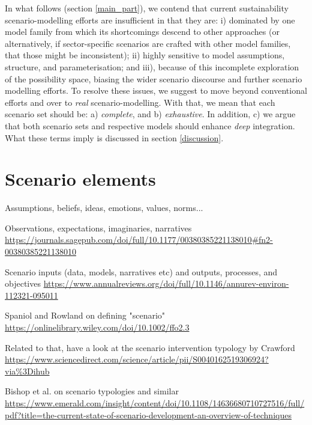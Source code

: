 \documentclass{article}
\begin{document}
\begin{refsection}
In what follows (section \ref{main_part}), we contend that current sustainability scenario-modelling efforts are insufficient in that they are: i) dominated by one model family from which its shortcomings descend to other approaches (or alternatively, if sector-specific scenarios are crafted with other model families, that those might be inconsistent); ii) highly sensitive to model assumptions, structure, and parameterisation; and iii), because of this incomplete exploration of the possibility space, biasing the wider scenario discourse and further scenario modelling efforts. To resolve these issues, we suggest to move beyond conventional efforts and over to \textit{real} scenario-modelling. With that, we mean that each scenario set should be: a) \textit{complete}, and b) \textit{exhaustive}. In addition, c) we argue that both scenario sets and respective models should enhance \textit{deep} integration. What these terms imply is discussed in section \ref{discussion}.

\section{Scenario elements}
Assumptions, beliefs, ideas, emotions, values, norms...

Observations, expectations, imaginaries, narratives \url{https://journals.sagepub.com/doi/full/10.1177/00380385221138010#fn2-00380385221138010}

Scenario inputs (data, models, narratives etc) and outputs, processes, and objectives \url{https://www.annualreviews.org/doi/full/10.1146/annurev-environ-112321-095011}

Spaniol and Rowland on defining "scenario" \url{https://onlinelibrary.wiley.com/doi/10.1002/ffo2.3}

Related to that, have a look at the scenario intervention typology by Crawford \url{https://www.sciencedirect.com/science/article/pii/S0040162519306924?via%3Dihub}

Bishop et al. on scenario typologies and similar \url{https://www.emerald.com/insight/content/doi/10.1108/14636680710727516/full/pdf?title=the-current-state-of-scenario-development-an-overview-of-techniques}

\noindent{}


\end{refsection}
\end{document}

